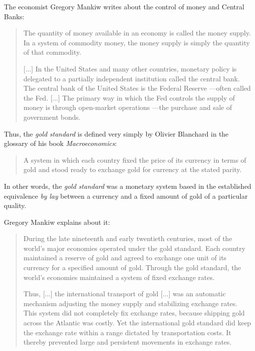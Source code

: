 \documentclass[12pt,a4paper,twoside]{book}
\begin{document}
The economist Gregory Mankiw writes about the control of money and Central Banks:

\begin{quotation}
The quantity of money available in an economy is called the money supply. In a system of commodity money, the money supply is simply the quantity of that commodity.

[...] In the United States and many other countries, monetary policy is delegated to a partially independent institution called the central bank. The central bank of the United States is the Federal Reserve —often called the Fed. [...] The primary way in which the Fed controls the supply of money is through open-market operations —the purchase and sale of government bonds. \cite[pp. 83-84]{mankiw:macroeconomics}
\end{quotation}

Thus, the \textit{gold standard} is defined very simply by Olivier Blanchard in the glossary of his book \textit{Macroeconomics}:

\begin{quote}
A system in which each country fixed the price of its currency in terms of gold and stood ready to exchange gold for currency at the stated parity. \cite[p. 415]{blanchard:macroeconomics}
\end{quote}

In other words, the \textit{gold standard} was a monetary system based in the established equivalence \textit{by lay} between a currency and a fixed amount of gold of a particular quality.

Gregory Mankiw explains about it:

\begin{quotation}
During the late nineteenth and early twentieth centuries, most of the world’s major economies operated under the gold standard. Each country maintained a reserve of gold and agreed to exchange one unit of its currency for a specified amount of gold. Through the gold standard, the world’s economies maintained a system of fixed exchange rates.

Thus, [...] the international transport of gold [...] was an automatic mechanism adjusting the money supply and stabilizing exchange rates. This system did not completely fix exchange rates, because shipping gold across the Atlantic was costly. Yet the international gold standard did keep the exchange rate within a range dictated by transportation costs. It thereby prevented large and persistent movements in exchange rates. \cite[pp. 351-352]{mankiw:macroeconomics}
\end{quotation}
\end{document}
